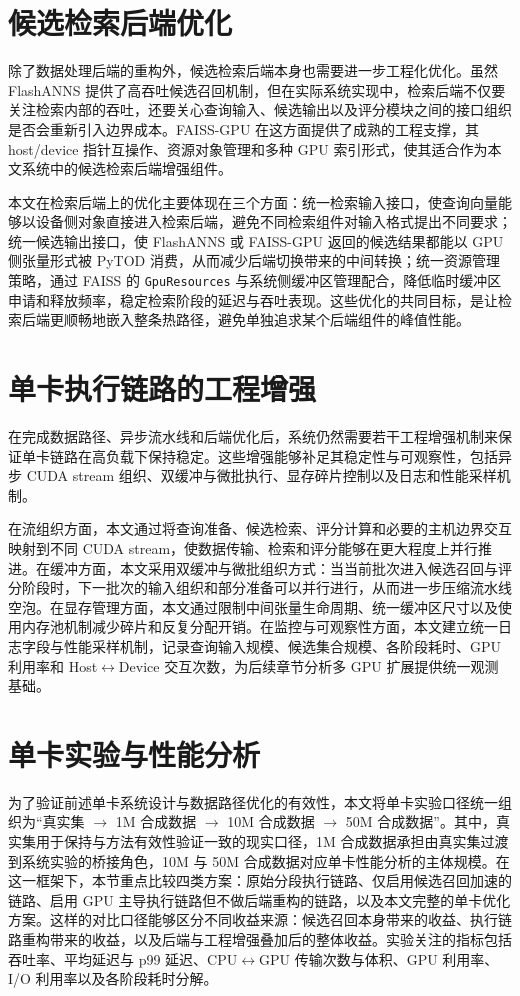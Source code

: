 \section{候选检索后端优化}

除了数据处理后端的重构外，候选检索后端本身也需要进一步工程化优化。虽然 FlashANNS 提供了高吞吐候选召回机制，但在实际系统实现中，检索后端不仅要关注检索内部的吞吐，还要关心查询输入、候选输出以及评分模块之间的接口组织是否会重新引入边界成本。FAISS-GPU 在这方面提供了成熟的工程支撑，其 host/device 指针互操作、资源对象管理和多种 GPU 索引形式，使其适合作为本文系统中的候选检索后端增强组件\citep{faiss_gpu_wiki}。

本文在检索后端上的优化主要体现在三个方面：统一检索输入接口，使查询向量能够以设备侧对象直接进入检索后端，避免不同检索组件对输入格式提出不同要求；统一候选输出接口，使 FlashANNS 或 FAISS-GPU 返回的候选结果都能以 GPU 侧张量形式被 PyTOD 消费，从而减少后端切换带来的中间转换；统一资源管理策略，通过 FAISS 的 \texttt{GpuResources} 与系统侧缓冲区管理配合，降低临时缓冲区申请和释放频率，稳定检索阶段的延迟与吞吐表现\citep{faiss_gpu_wiki}。这些优化的共同目标，是让检索后端更顺畅地嵌入整条热路径，避免单独追求某个后端组件的峰值性能。

\section{单卡执行链路的工程增强}

在完成数据路径、异步流水线和后端优化后，系统仍然需要若干工程增强机制来保证单卡链路在高负载下保持稳定。这些增强能够补足其稳定性与可观察性，包括异步 CUDA stream 组织、双缓冲与微批执行、显存碎片控制以及日志和性能采样机制。

在流组织方面，本文通过将查询准备、候选检索、评分计算和必要的主机边界交互映射到不同 CUDA stream，使数据传输、检索和评分能够在更大程度上并行推进。在缓冲方面，本文采用双缓冲与微批组织方式：当当前批次进入候选召回与评分阶段时，下一批次的输入组织和部分准备可以并行进行，从而进一步压缩流水线空泡。在显存管理方面，本文通过限制中间张量生命周期、统一缓冲区尺寸以及使用内存池机制减少碎片和反复分配开销。在监控与可观察性方面，本文建立统一日志字段与性能采样机制，记录查询输入规模、候选集合规模、各阶段耗时、GPU 利用率和 Host$\leftrightarrow$Device 交互次数，为后续章节分析多 GPU 扩展提供统一观测基础。

\section{单卡实验与性能分析}

为了验证前述单卡系统设计与数据路径优化的有效性，本文将单卡实验口径统一组织为“真实集 $\rightarrow$ 1M 合成数据 $\rightarrow$ 10M 合成数据 $\rightarrow$ 50M 合成数据”。其中，真实集用于保持与方法有效性验证一致的现实口径，1M 合成数据承担由真实集过渡到系统实验的桥接角色，10M 与 50M 合成数据对应单卡性能分析的主体规模。在这一框架下，本节重点比较四类方案：原始分段执行链路、仅启用候选召回加速的链路、启用 GPU 主导执行链路但不做后端重构的链路，以及本文完整的单卡优化方案。这样的对比口径能够区分不同收益来源：候选召回本身带来的收益、执行链路重构带来的收益，以及后端与工程增强叠加后的整体收益。实验关注的指标包括吞吐率、平均延迟与 p99 延迟、CPU$\leftrightarrow$GPU 传输次数与体积、GPU 利用率、I/O 利用率以及各阶段耗时分解。


